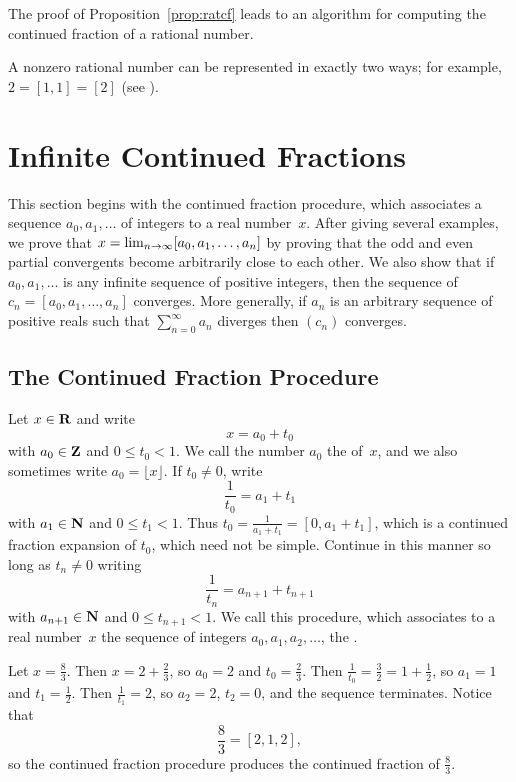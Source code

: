 The proof of Proposition~\ref{prop:ratcf} leads to an algorithm
for computing the continued fraction of a rational number.

A nonzero rational number can be represented in exactly two ways;
for example, $2=[1,1] = [2]$ (see ).


\section{Infinite Continued Fractions}\label{sec:cfinfty}
This section begins with the continued fraction procedure, which associates
a sequence $a_0,a_1,\ldots$ of integers to a real number~$x$.  After
giving several examples, we prove that $x = \lim_{n\rightarrow\infty}
[a_0,a_1,\ldots,a_n]$ by proving that the odd and even partial
convergents become arbitrarily close to each other.
We also show that if $a_0,a_1,\ldots$ is any infinite
sequence of positive integers, then the sequence of
$c_n=[a_0,a_1,\ldots,a_n]$
converges. More generally, if $a_n$ is an arbitrary sequence
of positive reals
such that $\sum_{n=0}^{\infty} a_n$ diverges then $(c_n)$ converges.

\subsection{The Continued Fraction Procedure}
\label{sec:cfalg}
Let $x\in\mathbf{R}$ and write
  $$x = a_0 + t_0$$
with $a_0\in\mathbf{Z}$ and $0\leq t_0 < 1$.
We call the number $a_0$ the  of~$x$, and
we also sometimes write $a_0 = \lfloor x \rfloor$.
If $t_0\neq 0$, write
$$\frac{1}{t_0} = a_1 + t_1$$ with $a_1\in\mathbf{N}$ and $0\leq t_1 < 1$.
Thus $t_0 = \frac{1}{a_1 + t_1}=[0,a_1+t_1]$, which is a
continued fraction expansion of $t_0$, which need not be simple.
Continue in this manner so long as $t_n\neq 0$ writing
$$
  \frac{1}{t_n} = a_{n+1} + t_{n+1}
$$
with $a_{n+1}\in\mathbf{N}$ and $0\leq t_{n+1}<1$.
We call this procedure, which associates to a real number~$x$ the sequence
of integers $a_0, a_1, a_2, \ldots $, the
.

\begin{example}
Let $x=\frac{8}{3}$.  Then $x=2+\frac{2}{3}$, so
$a_0=2$ and $t_0=\frac{2}{3}$.  Then
$\frac{1}{t_0}=\frac{3}{2} = 1+\frac{1}{2}$, so $a_1=1$ and $t_1=\frac{1}{2}$.
Then $\frac{1}{t_1} = 2$, so $a_2=2$, $t_2=0$, and the sequence terminates.
Notice that
$$ \frac{8}{3} = [2,1,2],$$
so the continued fraction procedure produces the
continued fraction of $\frac{8}{3}$.
\end{example}



